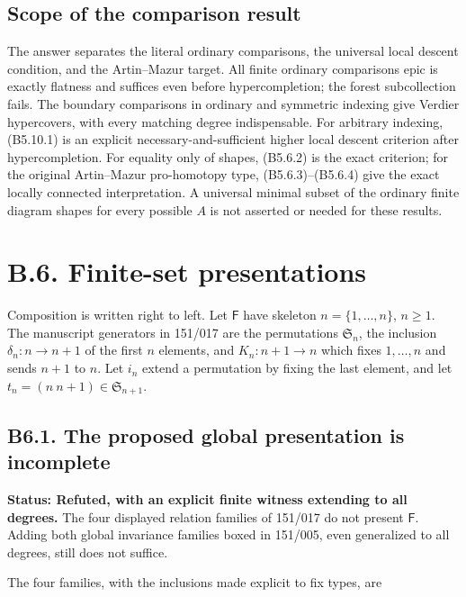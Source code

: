 \subsection{Scope of the comparison
result}\label{scope-of-the-comparison-result}

The answer separates the literal ordinary comparisons, the universal
local descent condition, and the Artin--Mazur target. All finite
ordinary comparisons epic is exactly flatness and suffices even before
hypercompletion; the forest subcollection fails. The boundary
comparisons in ordinary and symmetric indexing give Verdier hypercovers,
with every matching degree indispensable. For arbitrary indexing,
(B5.10.1) is an explicit necessary-and-sufficient higher local descent
criterion after hypercompletion. For equality only of shapes, (B5.6.2)
is the exact criterion; for the original Artin--Mazur pro-homotopy type,
(B5.6.3)--(B5.6.4) give the exact locally connected interpretation.
A universal minimal subset of
the ordinary finite diagram shapes for every possible \(A\) is not
asserted or needed for these results.

\section{B.6. Finite-set presentations}\label{b.6.-presentations-of-the-category-of-nonempty-finite-sets}

Composition is written right to left. Let \(\mathsf F\) have skeleton
\(n=\{1,\ldots,n\}\), \(n\ge1\). The manuscript generators in 151/017
are the permutations \(\mathfrak S_n\), the inclusion
\(\delta_n:n\to n+1\) of the first \(n\) elements, and \(K_n:n+1\to n\)
which fixes \(1,\ldots,n\) and sends \(n+1\) to \(n\). Let \(i_n\)
extend a permutation by fixing the last element, and let
\(t_n=(n\ n+1)\in\mathfrak S_{n+1}\).

\subsection{B6.1. The proposed global presentation is
incomplete}\label{b6.1.-the-proposed-global-presentation-is-incomplete}

\textbf{Status: Refuted, with an explicit finite witness extending to
all degrees.} The four displayed relation families of 151/017 do not
present \(\mathsf F\). Adding both global invariance families boxed in
151/005, even generalized to all degrees, still does not suffice.

The four families, with the inclusions made explicit to fix types, are

